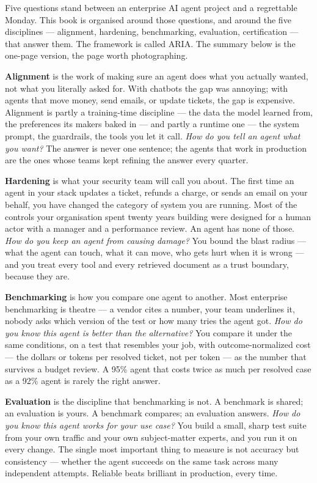 \label{ch:executive-summary}

\starttwocol

Five questions stand between an enterprise AI agent project and a regrettable Monday. This book is organised around those questions, and around the five disciplines --- alignment, hardening, benchmarking, evaluation, certification --- that answer them. The framework is called ARIA. The summary below is the one-page version, the page worth photographing.

\textbf{Alignment} is the work of making sure an agent does what you actually wanted, not what you literally asked for. With chatbots the gap was annoying; with agents that move money, send emails, or update tickets, the gap is expensive. Alignment is partly a training-time discipline --- the data the model learned from, the preferences its makers baked in --- and partly a runtime one --- the system prompt, the guardrails, the tools you let it call. \textit{How do you tell an agent what you want?} The answer is never one sentence; the agents that work in production are the ones whose teams kept refining the answer every quarter.

\textbf{Hardening} is what your security team will call you about. The first time an agent in your stack updates a ticket, refunds a charge, or sends an email on your behalf, you have changed the category of system you are running. Most of the controls your organisation spent twenty years building were designed for a human actor with a manager and a performance review. An agent has none of those. \textit{How do you keep an agent from causing damage?} You bound the blast radius --- what the agent can touch, what it can move, who gets hurt when it is wrong --- and you treat every tool and every retrieved document as a trust boundary, because they are.

\textbf{Benchmarking} is how you compare one agent to another. Most enterprise benchmarking is theatre --- a vendor cites a number, your team underlines it, nobody asks which version of the test or how many tries the agent got. \textit{How do you know this agent is better than the alternative?} You compare it under the same conditions, on a test that resembles your job, with outcome-normalized cost --- the dollars or tokens per resolved ticket, not per token --- as the number that survives a budget review. A 95\% agent that costs twice as much per resolved case as a 92\% agent is rarely the right answer.

\textbf{Evaluation} is the discipline that benchmarking is not. A benchmark is shared; an evaluation is yours. A benchmark compares; an evaluation answers. \textit{How do you know this agent works for your use case?} You build a small, sharp test suite from your own traffic and your own subject-matter experts, and you run it on every change. The single most important thing to measure is not accuracy but consistency --- whether the agent succeeds on the same task across many independent attempts. Reliable beats brilliant in production, every time.

